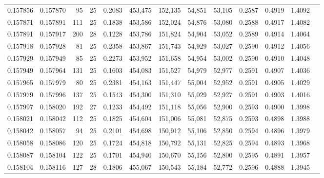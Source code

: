 \begin{tabular}{rrrrrrrrrrrrr}
0.157856 & 0.157870 &  95 &  25 &                                     0.2083 & 453,475 & 152,135 &  54,851 &  53,105 & 0.2587 & 0.4919 & 1.4092 \\
0.157871 & 0.157891 & 111 &  25 &                                     0.1838 & 453,586 & 152,024 &  54,876 &  53,080 & 0.2588 & 0.4917 & 1.4082 \\
0.157891 & 0.157917 & 200 &  28 &                                     0.1228 & 453,786 & 151,824 &  54,904 &  53,052 & 0.2589 & 0.4914 & 1.4064 \\
0.157918 & 0.157928 &  81 &  25 &                                     0.2358 & 453,867 & 151,743 &  54,929 &  53,027 & 0.2590 & 0.4912 & 1.4056 \\
0.157929 & 0.157949 &  85 &  25 &                                     0.2273 & 453,952 & 151,658 &  54,954 &  53,002 & 0.2590 & 0.4910 & 1.4048 \\
0.157949 & 0.157964 & 131 &  25 &                                     0.1603 & 454,083 & 151,527 &  54,979 &  52,977 & 0.2591 & 0.4907 & 1.4036 \\
0.157965 & 0.157979 &  80 &  25 &                                     0.2381 & 454,163 & 151,447 &  55,004 &  52,952 & 0.2591 & 0.4905 & 1.4029 \\
0.157979 & 0.157996 & 137 &  25 &                                     0.1543 & 454,300 & 151,310 &  55,029 &  52,927 & 0.2591 & 0.4903 & 1.4016 \\
0.157997 & 0.158020 & 192 &  27 &                                     0.1233 & 454,492 & 151,118 &  55,056 &  52,900 & 0.2593 & 0.4900 & 1.3998 \\
0.158021 & 0.158042 & 112 &  25 &                                     0.1825 & 454,604 & 151,006 &  55,081 &  52,875 & 0.2593 & 0.4898 & 1.3988 \\
0.158042 & 0.158057 &  94 &  25 &                                     0.2101 & 454,698 & 150,912 &  55,106 &  52,850 & 0.2594 & 0.4896 & 1.3979 \\
0.158058 & 0.158086 & 120 &  25 &                                     0.1724 & 454,818 & 150,792 &  55,131 &  52,825 & 0.2594 & 0.4893 & 1.3968 \\
0.158087 & 0.158104 & 122 &  25 &                                     0.1701 & 454,940 & 150,670 &  55,156 &  52,800 & 0.2595 & 0.4891 & 1.3957 \\
0.158104 & 0.158116 & 127 &  28 &                                     0.1806 & 455,067 & 150,543 &  55,184 &  52,772 & 0.2596 & 0.4888 & 1.3945 \\

\end{tabular}
